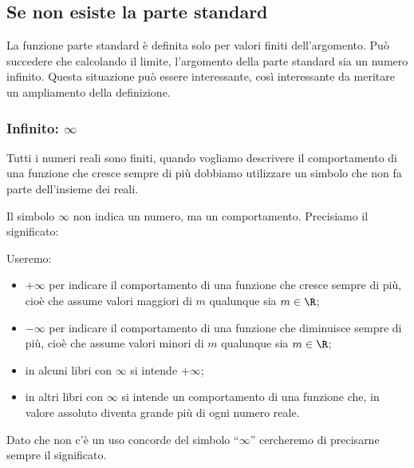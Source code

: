 \subsection{Se non esiste la parte standard}
\label{subsec:cont_limiti_nonsempreesiste}

La funzione parte standard è definita solo per valori finiti 
dell'argomento.
Può succedere che calcolando il limite, l'argomento della parte standard sia  
un numero infinito. Questa situazione può essere interessante, così 
interessante da meritare un ampliamento della definizione.

\subsubsection{Infinito: \(\infty\)}

Tutti i numeri reali sono finiti, quando vogliamo descrivere il comportamento 
di una funzione che cresce sempre di più dobbiamo utilizzare un simbolo che 
non fa parte dell'insieme dei reali. 

Il simbolo \(\infty\) non indica un numero, ma un comportamento.
Precisiamo il significato:

\begin{definizione}
Useremo:
\begin{itemize}
\item \(+\infty\) per indicare il comportamento di una funzione che cresce 
sempre di più, 
cioè che assume valori maggiori di \(m\) qualunque sia \(m \in \R\);
\item \(-\infty\) per indicare il comportamento di una funzione che 
diminuisce sempre di più, 
cioè che assume valori minori di \(m\) qualunque sia \(m \in \R\);
\item in alcuni libri con \(\infty\) si intende \(+\infty\); 
\item in altri libri con \(\infty\) si intende un comportamento di una 
funzione che, in valore assoluto diventa grande più di ogni numero reale.
\end{itemize}
\end{definizione}

Dato che non c'è un uso concorde del simbolo ``\(\infty\)'' cercheremo 
di precisarne sempre il significato.

